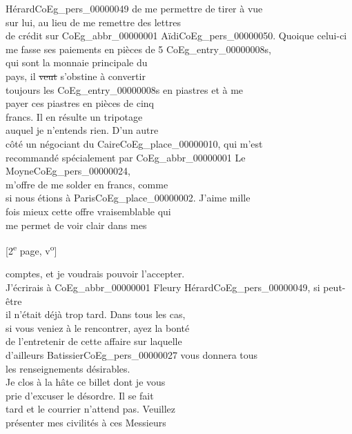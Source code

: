 \documentclass{book}
\begin{document}
Hérard\gls{CoEg_pers_00000049} de me permettre de tirer à vue\\
sur lui, au lieu de me remettre des lettres\\
de crédit sur \gls{CoEg_abbr_00000001} Aïdi\gls{CoEg_pers_00000050}. Quoique celui-ci\\
me fasse ses paiements en pièces de 5 \glspl{CoEg_entry_00000008},\\
qui sont la monnaie principale du\\
pays, il \sout{veut} s’obstine à convertir\\
toujours les \glspl{CoEg_entry_00000008} en piastres et à me\\
payer ces piastres en pièces de cinq\\
francs. Il en résulte un tripotage\\
auquel je n’entends rien. D’un autre\\
côté un négociant du Caire\gls{CoEg_place_00000010}, qui m’est\\
recommandé spécialement par \gls{CoEg_abbr_00000001} Le Moyne\gls{CoEg_pers_00000024},\\
m’offre de me solder en francs, comme\\
si nous étions à Paris\gls{CoEg_place_00000002}. J’aime mille\\
fois mieux cette offre vraisemblable qui\\
me permet de voir clair dans mes
{\footnotesize \begin{center} {[2\textsuperscript{e} page, v\textsuperscript{o}]}\end{center}}
\noindent comptes, et je voudrais pouvoir l’accepter.\\
J’écrirais à \gls{CoEg_abbr_00000001} Fleury Hérard\gls{CoEg_pers_00000049}, si peut-être\\
il n’était déjà trop tard. Dans tous les cas,\\
si vous veniez à le rencontrer, ayez la bonté\\
de l’entretenir de cette affaire sur laquelle\\
d’ailleurs Batissier\gls{CoEg_pers_00000027} vous donnera tous\\
les renseignements désirables.\\
\indent Je clos à la hâte ce billet dont je vous\\
prie d’excuser le désordre. Il se fait\\
tard et le courrier n’attend pas. Veuillez\\
présenter mes civilités à ces Messieurs\\
\end{document}
